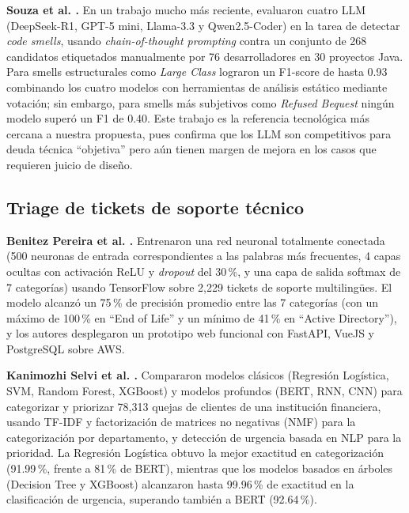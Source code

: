 \textbf{Souza et al. \parencite{Souza2026}.} En un trabajo mucho más reciente, evaluaron cuatro LLM (DeepSeek-R1, GPT-5 mini, Llama-3.3 y Qwen2.5-Coder) en la tarea de detectar \textit{code smells}, usando \textit{chain-of-thought prompting} \parencite{Wei2022} contra un conjunto de 268 candidatos etiquetados manualmente por 76 desarrolladores en 30 proyectos Java. Para smells estructurales como \textit{Large Class} lograron un F1-score de hasta 0.93 combinando los cuatro modelos con herramientas de análisis estático mediante votación; sin embargo, para smells más subjetivos como \textit{Refused Bequest} ningún modelo superó un F1 de 0.40. Este trabajo es la referencia tecnológica más cercana a nuestra propuesta, pues confirma que los LLM son competitivos para deuda técnica ``objetiva'' pero aún tienen margen de mejora en los casos que requieren juicio de diseño.

\subsection{Triage de tickets de soporte técnico}

\textbf{Benitez Pereira et al. \parencite{BenitezPereira2023}.} Entrenaron una red neuronal totalmente conectada (500 neuronas de entrada correspondientes a las palabras más frecuentes, 4 capas ocultas con activación ReLU y \textit{dropout} del 30\,\%, y una capa de salida softmax de 7 categorías) usando TensorFlow sobre 2{,}229 tickets de soporte multilingües. El modelo alcanzó un 75\,\% de precisión promedio entre las 7 categorías (con un máximo de 100\,\% en ``End of Life'' y un mínimo de 41\,\% en ``Active Directory''), y los autores desplegaron un prototipo web funcional con FastAPI, VueJS y PostgreSQL sobre AWS.

\textbf{Kanimozhi Selvi et al. \parencite{KanimozhiSelvi2025}.} Compararon modelos clásicos (Regresión Logística, SVM, Random Forest, XGBoost) y modelos profundos (BERT, RNN, CNN) para categorizar y priorizar 78{,}313 quejas de clientes de una institución financiera, usando TF-IDF y factorización de matrices no negativas (NMF) para la categorización por departamento, y detección de urgencia basada en NLP para la prioridad. La Regresión Logística obtuvo la mejor exactitud en categorización (91.99\,\%, frente a 81\,\% de BERT), mientras que los modelos basados en árboles (Decision Tree y XGBoost) alcanzaron hasta 99.96\,\% de exactitud en la clasificación de urgencia, superando también a BERT (92.64\,\%).

\pagebreak
